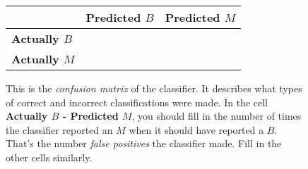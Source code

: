 \documentclass[11pt]{article}
\begin{document}
\begin{figure}[h]
  \centering
  \begin{tabular}{l || c | c |}
    ~ & \textbf{Predicted $B$} & \textbf{Predicted $M$} \\ \hline \hline
    \textbf{Actually $B$} & ~~~~~ & ~~~~~ \\ \hline
    \textbf{Actually $M$} & ~~~~~ & ~~~~~ \\ \hline
  \end{tabular}
  \caption{%
    This is the \emph{confusion matrix} of the classifier. It describes what
    types of correct and incorrect classifications were made.%
    In the cell \textbf{Actually $B$ - Predicted $M$}, you should fill in the
    number of times the classifier reported an $M$ when it should have reported
    a $B$. That's the number \emph{false positives} the classifier made.
    Fill in the other cells similarly.
  }
\end{figure}
\end{document}
